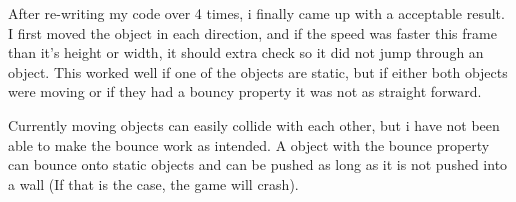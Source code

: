 \documentclass[a4paper,12pt]{article}
\begin{document}
After re-writing my code over 4 times, i finally came up with a acceptable result.
I first moved the object in each direction, and if the speed was faster this frame than it's height or width, it should extra check so it did not jump through an object.
This worked well if one of the objects are static, but if either both objects were moving or if they had a bouncy property it was not as straight forward.

Currently moving objects can easily collide with each other, but i have not been able to make the bounce work as intended.
A object with the bounce property can bounce onto static objects and can be pushed as long as it is not pushed into a wall (If that is the case, the game will crash).
\end{document}
